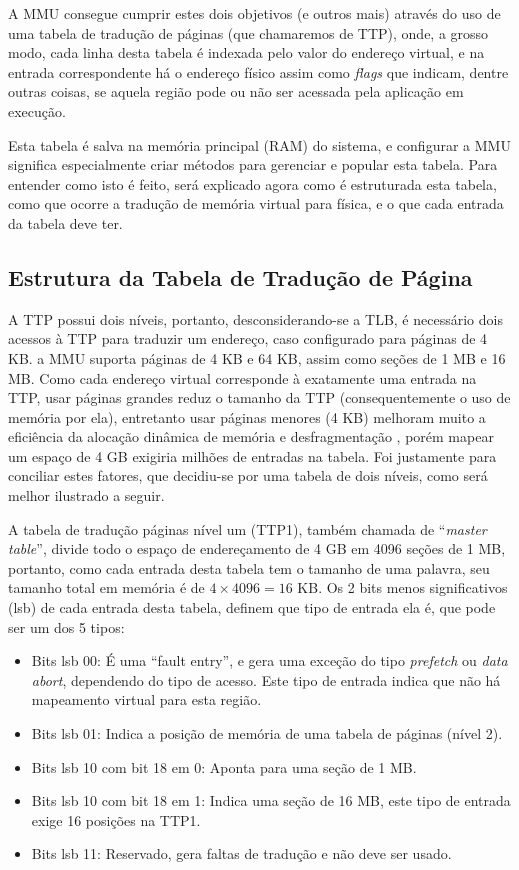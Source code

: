 A MMU consegue cumprir estes dois objetivos (e outros mais) através do uso de uma tabela de tradução de páginas (que chamaremos de TTP), onde, a grosso modo, cada linha desta tabela é indexada pelo valor do endereço virtual, e na entrada correspondente há o endereço físico assim como \emph{flags} que indicam, dentre outras coisas, se aquela região pode ou não ser acessada pela aplicação em execução.

Esta tabela é salva na memória principal (RAM) do sistema, e configurar a MMU significa especialmente criar métodos para gerenciar e popular esta tabela. Para entender como isto é feito, será explicado agora como é estruturada esta tabela, como que ocorre a tradução de memória virtual para física, e o que cada entrada da tabela deve ter.

\subsection{Estrutura da Tabela de Tradução de Página}

A TTP possui dois níveis, portanto, desconsiderando-se a TLB, é necessário dois acessos à TTP para traduzir um endereço, caso configurado para páginas de 4 KB. a MMU suporta páginas de 4 KB e 64 KB, assim como seções de 1 MB e 16 MB. Como cada endereço virtual corresponde à exatamente uma entrada na TTP, usar páginas grandes reduz o tamanho da TTP (consequentemente o uso de memória por ela), entretanto usar páginas menores (4 KB) melhoram muito a eficiência da alocação dinâmica de memória e desfragmentação \cite[p.~77]{ug585.1.7}, porém mapear um espaço de 4 GB exigiria milhões de entradas na tabela. Foi justamente para conciliar estes fatores, que decidiu-se por uma tabela de dois níveis, como será melhor ilustrado a seguir.

A tabela de tradução páginas nível um (TTP1), também chamada de ``\emph{master table}'', divide todo o espaço de endereçamento de 4 GB em 4096 seções de 1 MB, portanto, como cada entrada desta tabela tem o tamanho de uma palavra, seu tamanho total em memória é de $4 \times 4096 = 16$ KB. Os 2 bits menos significativos (lsb) de cada entrada desta tabela, definem que tipo de entrada ela é, que pode ser um dos 5 tipos:

\begin{itemize}
	\item Bits lsb 00: É uma ``fault entry'', e gera uma exceção do tipo \emph{prefetch} ou \emph{data abort}, dependendo do tipo de acesso. Este tipo de entrada indica que não há mapeamento virtual para esta região.
	\item Bits lsb 01: Indica a posição de memória de uma tabela de páginas (nível 2).
	\item Bits lsb 10 com bit 18 em 0: Aponta para uma seção de 1 MB.
	\item Bits lsb 10 com bit 18 em 1: Indica uma seção de 16 MB, este tipo de entrada exige 16 posições na TTP1.
	\item Bits lsb 11: Reservado, gera faltas de tradução e não deve ser usado.
\end{itemize}

